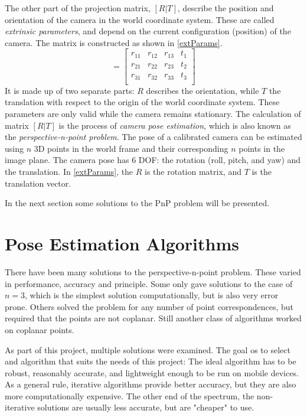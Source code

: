 The other part of the projection matrix, $[R | T]$, describe the position and orientation of the camera in the world coordinate system.
These are called \textit{extrinsic parameters}, and depend on the current configuration (position) of the camera.
The matrix is constructed as shown in \eqref{extParams}.
\begin{equation}
	[R | T] =
	\begin{bmatrix}
		r_{11} & r_{12} & r_{13} & t_1\\
		r_{21} & r_{22} & r_{23} & t_2\\
		r_{31} & r_{32} & r_{33} & t_3\\
	\end{bmatrix}
	\label{eq:extParams}
\end{equation}
It is made up of two separate parts: $R$ describes the orientation, while $T$ the translation with respect to the origin of the world coordinate system.
These parameters are only valid while the camera remains stationary.
The calculation of matrix $[R|T]$ is the process of \textit{camera pose estimation}, which is also known as the \textit{perspective-n-point problem}.
The pose of a calibrated camera can be estimated using $n$ 3D points in the world frame and their corresponding $n$ points in the image plane.
The camera pose has 6 DOF: the rotation (roll, pitch, and yaw) and the translation.
In \eqref{extParams}, the $R$ is the rotation matrix, and $T$ is the translation vector.

In the next section some solutions to the PnP problem will be presented.

\section{Pose Estimation Algorithms}

There have been many solutions to the perspective-n-point problem.
These varied in performance, accuracy and principle.
Some only gave solutions to the case of $n=3$, which is the simplest solution computationally, but is also very error prone. 
Others solved the problem for any number of point correspondences, but required that the points are not coplanar.
Still another class of algorithms worked on coplanar points.

As part of this project, multiple solutions were examined.
The goal os to select and algorithm that suits the needs of this project: The ideal algorithm has to be robust, reasonably accurate, and lightweight enough to be run on mobile devices.
As a general rule, iterative algorithms provide better accuracy, but they are also more computationally expensive.
The other end of the spectrum, the non-iterative solutions are usually less accurate, but are "cheaper" to use.

